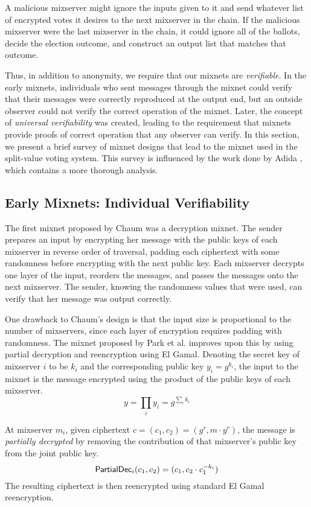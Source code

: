 A malicious mixserver might ignore the inputs given to it and send whatever list of encrypted votes it desires to the next mixserver in the chain. If the malicious mixserver were the last mixserver in the chain, it could ignore all of the ballots, decide the election outcome, and construct an output list that matches that outcome.

Thus, in addition to anonymity, we require that our mixnets are \emph{verifiable}. In the early mixnets, individuals who sent messages through the mixnet could verify that their messages were correctly reproduced at the output end, but an outside observer could not verify the correct operation of the mixnet. Later, the concept of \emph{universal verifiability} was created, leading to the requirement that mixnets provide proofs of correct operation that any observer can verify. In this section, we present a brief survey of mixnet designs that lead to the mixnet used in the split-value voting system. This survey is influenced by the work done by Adida \cite{adida-phd}, which contains a more thorough analysis.

\subsection{Early Mixnets: Individual Verifiability}

The first mixnet proposed by Chaum \cite{chaum81} was a decryption mixnet. The sender prepares an input by encrypting her message with the public keys of each mixserver in reverse order of traversal, padding each ciphertext with some randomness before encrypting with the next public key. Each mixserver decrypts one layer of the input, reorders the messages, and passes the messages onto the next mixserver. The sender, knowing the randomness values that were used, can verify that her message was output correctly.

One drawback to Chaum's design is that the input size is proportional to the number of mixservers, since each layer of encryption requires padding with randomness. The mixnet proposed by Park et al. \cite{park94} improves upon this by using partial decryption and reencryption using El Gamal. Denoting the secret key of mixserver $i$ to be $k_i$ and the corresponding public key $y_i = g^{k_i}$, the input to the mixnet is the message encrypted using the product of the public keys of each mixserver.
$$
y = \prod_{i}{y_i} = g^{\sum_{i}{k_i}}
$$

At mixserver $m_i$, given ciphertext $c = (c_1, c_2) = (g^r, m \cdot y^r)$, the message is \emph{partially decrypted} by removing the contribution of that mixserver's public key from the joint public key.
$$
\operatorname{\mathsf{PartialDec}}_{i}(c_1, c_2) = (c_1, c_2 \cdot c_{1}^{-k_i})
$$
The resulting ciphertext is then reencrypted using standard El Gamal reencryption.

